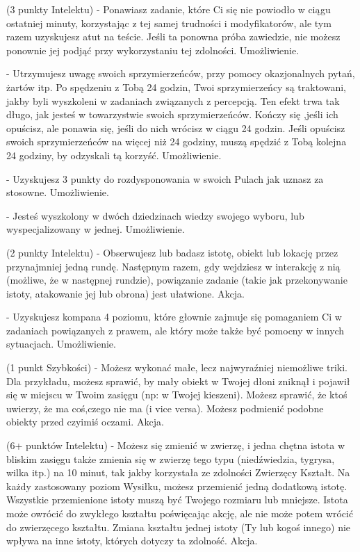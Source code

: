 { (3 punkty Intelektu) - Ponawiasz zadanie, które Ci się nie powiodło w ciągu ostatniej minuty, korzystając z tej samej trudności i modyfikatorów, ale tym razem uzyskujesz atut na teście. Jeśli ta ponowna próba zawiedzie, nie możesz ponownie jej podjąć przy wykorzystaniu tej zdolności. Umożliwienie.

  - Utrzymujesz uwagę swoich sprzymierzeńców, przy pomocy okazjonalnych pytań, żartów itp. Po spędzeniu z Tobą 24 godzin, Twoi sprzymierzeńcy są traktowani, jakby byli wyszkoleni w zadaniach związanych z percepcją. Ten efekt trwa tak długo, jak jesteś w towarzystwie swoich sprzymierzeńców. Kończy się ,jeśli ich opuścisz, ale ponawia się, jeśli do nich wrócisz w ciągu 24 godzin. Jeśli opuścisz swoich sprzymierzeńców na więcej niż 24 godziny, muszą spędzić z Tobą kolejna 24 godziny, by odzyskali tą korzyść. Umożliwienie.

 - Uzyskujesz 3 punkty do rozdysponowania w swoich Pulach jak uznasz za stosowne. Umożliwienie.

 - Jesteś wyszkolony w dwóch dziedzinach wiedzy swojego wyboru, lub wyspecjalizowany w jednej. Umożliwienie.

 (2 punkty Intelektu) - Obserwujesz lub badasz istotę, obiekt lub lokację przez przynajmniej jedną rundę. Następnym razem, gdy wejdziesz w interakcję z nią (możliwe, że w następnej rundzie), powiązanie zadanie (takie jak przekonywanie istoty, atakowanie jej lub obrona) jest ułatwione. Akcja.

 - Uzyskujesz kompana 4 poziomu, które głownie zajmuje się pomaganiem Ci w zadaniach powiązanych z prawem, ale który może także być pomocny w innych sytuacjach. Umożliwienie.

 (1 punkt Szybkości) - Możesz wykonać małe, lecz najwyraźniej niemożliwe triki. Dla przykładu, możesz sprawić, by mały obiekt w Twojej dłoni zniknął i pojawił się w miejscu w Twoim zasięgu (np: w Twojej kieszeni). Możesz sprawić, że ktoś uwierzy, że ma coś,czego nie ma (i vice versa). Możesz podmienić podobne obiekty przed czyimiś oczami. Akcja.

 (6+ punktów Intelektu) - Możesz się zmienić w zwierzę, i jedna chętna istota w bliskim zasięgu także zmienia się w zwierzę tego typu (niedźwiedzia, tygrysa, wilka itp.) na 10 minut, tak jakby korzystała ze zdolności Zwierzęcy Kształt. Na każdy zastosowany poziom Wysiłku, możesz przemienić jedną dodatkową istotę. Wszystkie przemienione istoty muszą być Twojego rozmiaru lub mniejsze. Istota może owrócić do zwykłego kształtu poświęcając akcję, ale nie może potem wrócić do zwierzęcego kształtu. Zmiana kształtu jednej istoty (Ty lub kogoś innego) nie wpływa na inne istoty, których dotyczy ta zdolność. Akcja.

}

